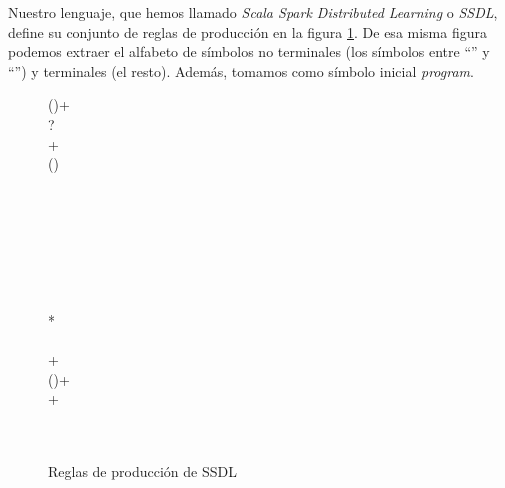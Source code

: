 Nuestro lenguaje, que hemos llamado \textit{Scala Spark Distributed Learning} o \textit{SSDL}, define su conjunto de
reglas de producción en la figura \ref{fig:ssdl-gram-bnf}. De esa misma figura podemos extraer el alfabeto de
símbolos no terminales (los símbolos entre ``\textlangle'' y ``\textrangle'') y terminales (el resto). Además, 
tomamos como símbolo inicial \textit{program}.

\begin{figure}[thb!]
    \centering
    \begin{bnf*}
    {(\bnfor{})+}\\
    {   \bnfor
       \bnfor
      ?}\\
    { \bnfts{:}  +}\\
    { (\bnfor{})}\\
    {\bnfor{}\bnfts{[}\bnfts{,}\bnfts{]}\bnfor}\\
\\
    {\bnfor{}\bnfor{}\bnfor}\\
\\
\\
    {\bnfor{}}\\
    {\bnfor{}}\\
    {\bnfts{/*}*\bnfts{*/}}\\
    {}\\
    {+}\\
    {(\bnfor{})+}\\
    {+}\\
    {\bnfor{}\bnfor\bnfts{\_}\bnfor\bnfsk\bnfor\bnfts{+}}\\
    {\bnfor{}\bnfor\bnfsk\bnfor{}\bnfor{}\bnfor\bnfsk\bnfor{}}\\
    {\bnfor{}\bnfor\bnfsk\bnfor{}}
\end{bnf*}
    \caption{Reglas de producción de SSDL}
    \label{fig:ssdl-gram-bnf}
\end{figure}

